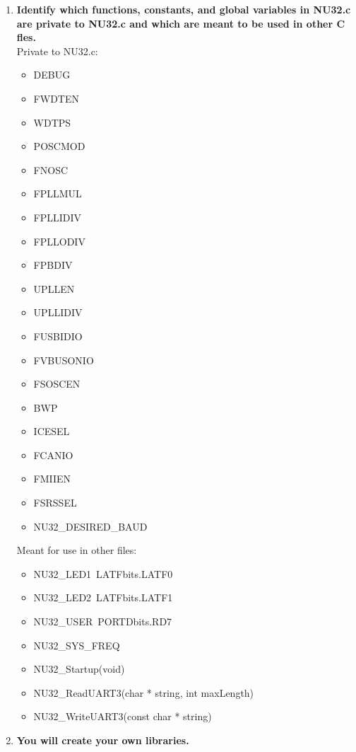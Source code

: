 \documentclass{article}
\begin{document}
\begin{enumerate}[label=\textbf{\arabic*})]
    \item \textbf{Identify which functions, constants, and global variables in NU32.c are private to NU32.c
    and which are meant to be used in other C fles.} \\

    Private to NU32.c:
    \begin{itemize}
        \item DEBUG
        \item FWDTEN
        \item WDTPS
        \item POSCMOD
        \item FNOSC
        \item FPLLMUL
        \item FPLLIDIV
        \item FPLLODIV
        \item FPBDIV
        \item UPLLEN
        \item UPLLIDIV
        \item FUSBIDIO
        \item FVBUSONIO
        \item FSOSCEN
        \item BWP
        \item ICESEL
        \item FCANIO
        \item FMIIEN
        \item FSRSSEL
        \item NU32\_DESIRED\_BAUD
    \end{itemize} 

    Meant for use in other files:
    \begin{itemize}
        \item NU32\_LED1\ LATFbits.LATF0
        \item NU32\_LED2\ LATFbits.LATF1
        \item NU32\_USER\ PORTDbits.RD7
        \item NU32\_SYS\_FREQ
        \item NU32\_Startup(void)
        \item NU32\_ReadUART3(char * string, int maxLength)
        \item NU32\_WriteUART3(const char * string)
    \end{itemize}

    \item \textbf{You will create your own libraries.} \\
    

\end{enumerate}
\end{document}
